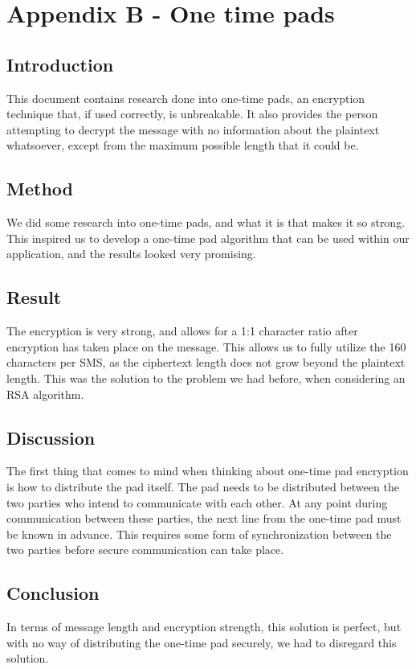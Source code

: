\section{Appendix B - One time pads}

\subsection*{Introduction}

This document contains research done into one-time pads, an encryption technique that, if used correctly, is unbreakable. It also provides the person attempting to decrypt the message with no information about the plaintext whatsoever, except from the maximum possible length that it could be.
\subsection*{Method}

We did some research into one-time pads, and what it is that makes it so strong. This inspired us to develop a one-time pad algorithm that can be used within our application, and the results looked very promising.
\subsection*{Result}

The encryption is very strong, and allows for a 1:1 character ratio after encryption has taken place on the message. This allows us to fully utilize the 160 characters per SMS, as the ciphertext length does not grow beyond the plaintext length. This was the solution to the problem we had before, when considering an RSA algorithm.
\subsection*{Discussion}

The first thing that comes to mind when thinking about one-time pad encryption is how to distribute the pad itself. The pad needs to be distributed between the two parties who intend to communicate with each other. At any point during communication between these parties, the next line from the one-time pad must be known in advance. This requires some form of synchronization between the two parties before secure communication can take place.
\subsection*{Conclusion}

In terms of message length and encryption strength, this solution is perfect, but with no way of distributing the one-time pad securely, we had to disregard this solution.